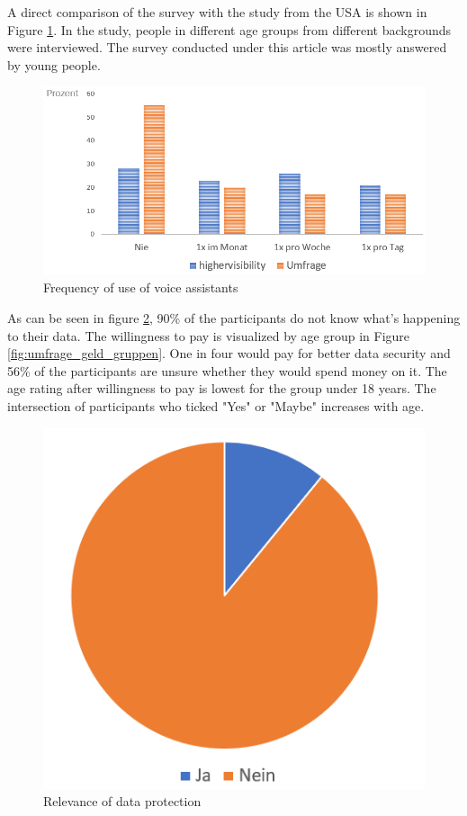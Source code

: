A direct comparison of the survey with the study from the USA is shown in Figure \ref{fig:umfrage_haeufigkeit}. In the study, people in different age groups from different backgrounds were interviewed. The survey conducted under this article was mostly answered by young people.
\begin{figure}[h]
	\centering
	\includegraphics[width=0.9\linewidth]{Picture/umfrage_haeufigkeit}
	\caption[Frequency of use of voice assistants]{Frequency of use of voice assistants}
	\label{fig:umfrage_haeufigkeit}
\end{figure} 

As can be seen in figure \ref{fig:umfrage_datenschutz}, 90\% of the participants do not know what's happening to their data. The willingness to pay is visualized by age group in Figure \ref{fig:umfrage_geld_gruppen}. One in four would pay for better data security and 56\% of the participants are unsure whether they would spend money on it. The age rating after willingness to pay is lowest for the group under 18 years. The intersection of participants who ticked "Yes" or "Maybe" increases with age.

\begin{figure}[h]
	\centering
	\includegraphics[width=0.5\linewidth]{Picture/umfrage_datenschutz}
	\caption[Relevance of data protection]{Relevance of data protection}
	\label{fig:umfrage_datenschutz}
\end{figure}


